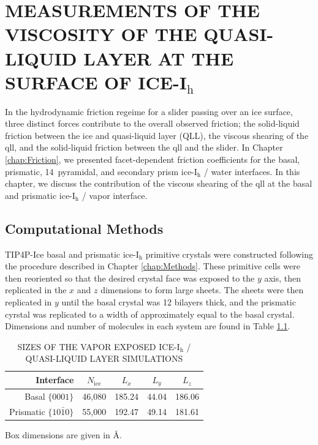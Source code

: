 \chapter{MEASUREMENTS OF THE VISCOSITY OF THE QUASI-LIQUID LAYER AT THE SURFACE OF ICE-I$_\mathrm{h}$}\label{chap:QLL}

In the hydrodynamic friction regeime for a slider passing over an ice surface, three distinct forces contribute to the overall observed friction; the solid-liquid friction between the ice and quasi-liquid layer (QLL), the viscous shearing of the qll, and the solid-liquid friction between the qll and the slider. In Chapter \ref{chap:Friction}, we presented facet-dependent friction coefficients for the basal, prismatic, 14\degree~pyramidal, and secondary prism ice-I$_\mathrm{h}$ / water interfaces. In this chapter, we discuss the contribution of the viscous shearing of the qll at the basal and prismatic ice-I$_\mathrm{h}$ / vapor interface.



\section{Computational Methods}
TIP4P-Ice basal and prismatic ice-I$_\mathrm{h}$ primitive crystals were constructed following the procedure described in Chapter \ref{chap:Methods}. These primitive cells were then reoriented so that the desired crystal face was exposed to the $y$ axis, then replicated in the $x$ and $z$ dimensions to form large sheets. The sheets were then replicated in $y$ until the basal crystal was 12 bilayers thick, and the prismatic cyrstal was replicated to a width of approximately equal to the basal crystal. Dimensions and number of molecules in each system are found in Table \ref{tab:qll-method}.


\begin{table}[h]
\centering
\caption{SIZES OF THE VAPOR EXPOSED ICE-I$_\mathrm{h}$ / QUASI-LIQUID LAYER SIMULATIONS\label{tab:qll-method}}
\begin{tabular}{r|c|ccc}
\hline
\hline
 Interface & $N_\mathrm{ice}$ & $L_x$ & $L_y$ & $L_z$ \\
\hline
Basal  $\{0001\}$                           & 46,080 & 185.24 & 44.04 & 186.06 \\
Prismatic  $\{10\bar{1}0\}$            & 55,000 & 192.47 & 49.14 & 181.61\\
\hline
\hline
\end{tabular}
\begin{flushleft}
Box dimensions are given in \AA.
\end{flushleft}
\end{table}



